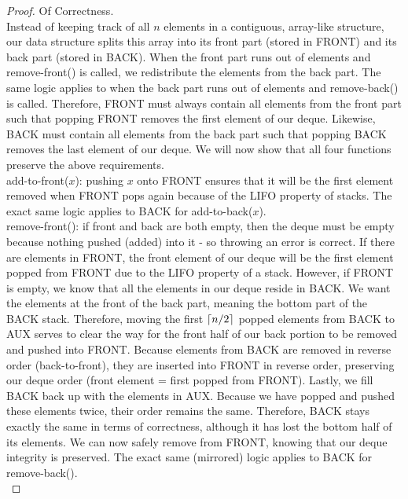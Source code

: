 \documentclass{article}
\DeclarePairedDelimiter{\ceil}{\lceil}{\rceil}
\theoremstyle{casestyle}
\begin{document}
\begin{proof} Of Correctness.\\
  Instead of keeping track of all $n$ elements in a contiguous, array-like structure, our data structure splits this array into its front part (stored in FRONT) and its back part (stored in BACK). When the front part runs out of elements and remove-front() is called, we redistribute the elements from the back part. The same logic applies to when the back part runs out of elements and remove-back() is called. Therefore, FRONT must always contain all elements from the front part such that popping FRONT removes the first element of our deque. Likewise, BACK must contain all elements from the back part such that popping BACK removes the last element of our deque. We will now show that all four functions preserve the above requirements. \\

  add-to-front($x$): pushing $x$ onto FRONT ensures that it will be the first element removed when FRONT pops again because of the LIFO property of stacks. The exact same logic applies to BACK for add-to-back($x$).\\

  remove-front(): if front and back are both empty, then the deque must be empty because nothing pushed (added) into it - so throwing an error is correct. If there are elements in FRONT, the front element of our deque will be the first element popped from FRONT due to the LIFO property of a stack. However, if FRONT is empty, we know that all the elements in our deque reside in BACK. We want the elements at the front of the back part, meaning the bottom part of the BACK stack. Therefore, moving the first $\ceil*{n/2}$ popped elements from BACK to AUX serves to clear the way for the front half of our back portion to be removed and pushed into FRONT. Because elements from BACK are removed in reverse order (back-to-front), they are inserted into FRONT in reverse order, preserving our deque order (front element = first popped from FRONT). Lastly, we fill BACK back up with the elements in AUX. Because we have popped and pushed these elements twice, their order remains the same. Therefore, BACK stays exactly the same in terms of correctness, although it has lost the bottom half of its elements. We can now safely remove from FRONT, knowing that our deque integrity is preserved. The exact same (mirrored) logic applies to BACK for remove-back().\\
\end{proof}
\end{document}
